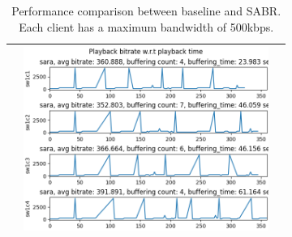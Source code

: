 \documentclass[12pt]{article}
\begin{document}
\begin{table}[ht]
\begin{tabular}{ | m{1em} | c | c |}
\begin{minipage}{.45\textwidth}
    \end{minipage}
    &
    \begin{minipage}{.45\textwidth}
      \includegraphics[width=\linewidth, height=60mm]{images/results/sabr_sara.png}
    \end{minipage}
    \\ \hline
  \end{tabular}
  \caption{Performance comparison between baseline and SABR. Each client has a maximum bandwidth of 500kbps.}\label{tbl:baseline_sabr}
\end{table}
\end{document}
